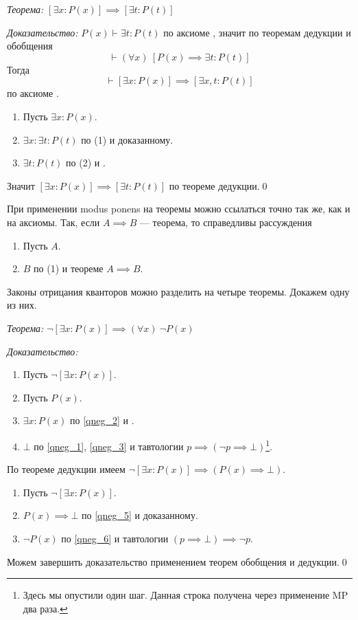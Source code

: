 {\it Теорема:}
$[\exists x:P(x)]\implies [\exists t:P(t)]$

{\it Доказательство:}
${P(x)\vdash\exists t:P(t)}$ по аксиоме \Ei{}, значит
по теоремам дедукции и обобщения
\[
  \vdash (\forall x)~[P(x)\implies \exists t:P(t)]
\]
Тогда
\[
  \vdash [\exists x:P(x)]\implies [\exists x,t:P(t)]
\]
по аксиоме \Et{}.
\begin{enumerate}[label=(\arabic*)]
  \item{}Пусть $\exists x:P(x)$.
  \item{}$\exists x:\exists t:P(t)$ по (1) и доказанному.
  \item{}$\exists t:P(t)$ по (2) и \Ee{}.
\end{enumerate}
Значит $[\exists x:P(x)]\implies[\exists t:P(t)]$
по теореме дедукции.\qed

При применении modus ponens на теоремы можно ссылаться точно так же,
как и на аксиомы. Так, если $A\implies B$ --- теорема, то
справедливы рассуждения
\begin{enumerate}[label=(\arabic*)]
  \item{}Пусть $A$.
  \item{}$B$ по (1) и теореме $A\implies B$.
\end{enumerate}

Законы отрицания кванторов можно разделить на четыре теоремы.
Докажем одну из них.

{\it Теорема:} $\lnot [\exists x:P(x)]\implies  (\forall x)~\lnot P(x)$

{\it Доказательство:}
\begin{enumerate}[label=(\arabic*)]
  \item{}\label{qneg_1}Пусть $\lnot[\exists x:P(x)]$.
  \item{}\label{qneg_2}Пусть $P(x)$.
  \item{}\label{qneg_3}$\exists x:P(x)$ по \ref{qneg_2} и \Ei{}.
  \item{}\label{qneg_4}$\bot$ по \ref{qneg_1}, \ref{qneg_3} и
  тавтологии $p\implies (\lnot p\implies \bot)$\footnote{Здесь мы опустили один шаг.
    Данная строка получена через применение MP два раза.}.
\end{enumerate}
По теореме дедукции имеем $\lnot[\exists x:P(x)]\implies (P(x)\implies\bot)$.
\begin{enumerate}[label=(\arabic*)]
  \item{}\label{qneg_5}Пусть $\lnot[\exists x:P(x)]$.
  \item{}\label{qneg_6}$P(x)\implies\bot$ по \ref{qneg_5} и доказанному.
  \item{}\label{qneg_7}$\lnot P(x)$ по \ref{qneg_6} и
  тавтологии $(p\implies \bot)\implies\lnot p$.
\end{enumerate}
Можем завершить доказательство применением теорем обобщения и дедукции.\qed

